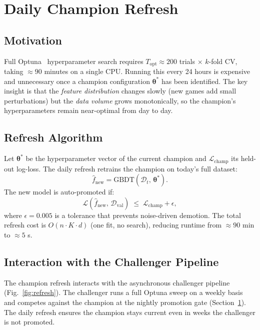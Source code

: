 \documentclass[conference]{IEEEtran}
\begin{document}
\section{Daily Champion Refresh}
\label{sec:refresh}

\subsection{Motivation}

Full Optuna~\cite{akiba2019} hyperparameter search requires $T_{\text{opt}} \approx 200$
trials $\times$ $k$-fold CV, taking $\approx 90$ minutes on a single
CPU.  Running this every 24 hours is expensive and unnecessary once
a champion configuration $\boldsymbol{\theta}^*$ has been identified.
The key insight is that the \emph{feature distribution} changes slowly
(new games add small perturbations) but the \emph{data volume} grows
monotonically, so the champion's hyperparameters remain near-optimal
from day to day.

\subsection{Refresh Algorithm}

Let $\boldsymbol{\theta}^*$ be the hyperparameter vector of the current
champion and $\mathcal{L}_{\text{champ}}$ its held-out log-loss.
The daily refresh retrains the champion on today's full dataset:
\begin{equation}
  \hat{f}_{\text{new}} = \text{GBDT}(\mathcal{D}_t,\, \boldsymbol{\theta}^*).
\label{eq:refresh}
\end{equation}
The new model is auto-promoted if:
\begin{equation}
  \mathcal{L}(\hat{f}_{\text{new}},\,\mathcal{D}_{\text{val}})
    \;\le\;
  \mathcal{L}_{\text{champ}} + \epsilon,
\label{eq:gate}
\end{equation}
where $\epsilon = 0.005$ is a tolerance that prevents noise-driven
demotion.  The total refresh cost is $O(n \cdot K \cdot d)$ (one fit,
no search), reducing runtime from $\approx90$ min to $\approx5$ s.

\subsection{Interaction with the Challenger Pipeline}

The champion refresh interacts with the asynchronous challenger
pipeline (Fig.~\ref{fig:refresh}).  The challenger runs a full
Optuna sweep on a weekly basis and competes against the champion
at the nightly promotion gate (Section~\ref{sec:refresh}).  The daily
refresh ensures the champion stays current even in weeks the challenger
is not promoted.
\end{document}
